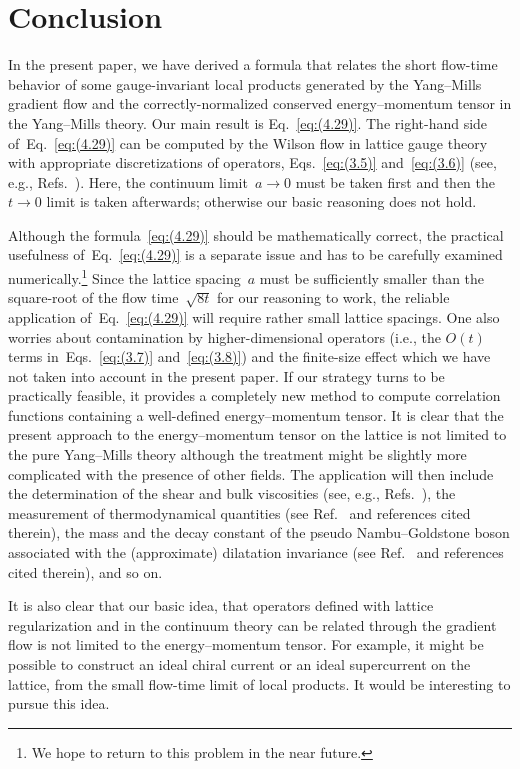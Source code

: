 \section{Conclusion}
In the present paper, we have derived a formula that relates the short
flow-time behavior of some gauge-invariant local products generated by the
Yang--Mills gradient flow and the correctly-normalized conserved
energy--momentum tensor in the Yang--Mills theory. Our main result is
Eq.~\eqref{eq:(4.29)}. The right-hand side of~Eq.~\eqref{eq:(4.29)} can be
computed by the Wilson flow in lattice gauge theory with appropriate
discretizations of operators, Eqs.~\eqref{eq:(3.5)} and~\eqref{eq:(3.6)} (see,
e.g., Refs.~\cite{Luscher:2010iy,Borsanyi:2012zs}). Here, the continuum
limit~$a\to0$ must be taken first and then the $t\to0$ limit is taken
afterwards; otherwise our basic reasoning does not hold.

Although the formula~\eqref{eq:(4.29)} should be mathematically correct, the
practical usefulness of~Eq.~\eqref{eq:(4.29)} is a separate issue and has to be
carefully examined numerically.\footnote{We hope to return to this problem in
the near future.} Since the lattice spacing~$a$ must be sufficiently smaller
than the square-root of the flow time~$\sqrt{8t}$ for our reasoning to work,
the reliable application of~Eq.~\eqref{eq:(4.29)} will require rather small
lattice spacings. One also worries about contamination by higher-dimensional
operators (i.e., the $O(t)$ terms in~Eqs.~\eqref{eq:(3.7)}
and~\eqref{eq:(3.8)}) and the finite-size effect which we have not taken into
account in the present paper. If our strategy turns to be practically feasible,
it provides a completely new method to compute correlation functions containing
a well-defined energy--momentum tensor. It is clear that the present approach
to the energy--momentum tensor on the lattice is not limited to the pure
Yang--Mills theory although the treatment might be slightly more complicated
with the presence of other fields. The application will then include the
determination of the shear and bulk viscosities (see, e.g.,
Refs.~\cite{Meyer:2007ic,Meyer:2007dy}), the measurement of
thermodynamical quantities (see Ref.~\cite{Giusti:2012yj} and references cited
therein), the mass and the decay constant of the pseudo Nambu--Goldstone boson
associated with the (approximate) dilatation invariance (see
Ref.~\cite{Appelquist:2010gy} and references cited therein), and so on.

It is also clear that our basic idea, that operators defined with lattice
regularization and in the continuum theory can be related through the gradient
flow is not limited to the energy--momentum tensor. For example, it might be
possible to construct an ideal chiral current or an ideal supercurrent on the
lattice, from the small flow-time limit of local products. It would be
interesting to pursue this idea.
